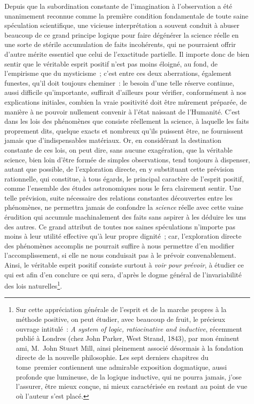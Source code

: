 \documentclass[french,twoside]{book} %
\begin{document}
Depuis que la subordination constante de l’imagination à l’observation a été unanimement reconnue comme la première condition fondamentale de toute saine spéculation scientifique, une vicieuse interprétation a souvent conduit à abuser beaucoup de ce grand principe logique pour faire dégénérer la science réelle en une sorte de stérile accumulation de faits incohérents, qui ne pourraient offrir d’autre mérite essentiel que celui de l’exactitude partielle. Il importe donc de bien sentir que le véritable esprit positif n’est pas moins éloigné, au fond, de l’empirisme que du mysticisme ; c’est entre ces deux aberrations, également funestes, qu’il doit toujours cheminer : le besoin d’une telle réserve continue, aussi difficile qu’importante, suffirait d’ailleurs pour vérifier, conformément à nos explications initiales, combien la vraie positivité doit être mûrement préparée, de manière à ne pouvoir nullement convenir à l’état naissant de l’Humanité. C’est dans les lois des phénomènes que consiste réellement la science, à laquelle les faits proprement dits, quelque exacts et nombreux qu’ils puissent être, ne fournissent jamais que d’indispensables matériaux. Or, en considérant la destination constante de ces lois, on peut dire, sans aucune exagération, que la véritable science, bien loin d’être formée de simples observations, tend toujours à dispenser, autant que possible, de l’exploration directe, en y substituant cette prévision rationnelle, qui constitue, à tous égards, le principal caractère de l’esprit positif, comme l’ensemble des études astronomiques nous le fera clairement sentir. Une telle prévision, suite nécessaire des relations constantes découvertes entre les phénomènes, ne permettra jamais de confondre la {\itshape science} réelle avec cette vaine érudition qui accumule machinalement des faits sans aspirer à les déduire les uns des autres. Ce grand attribut de toutes nos saines spéculations n’importe pas moins à leur utilité effective qu’à leur propre dignité ; car, l’exploration directe des phénomènes accomplis ne pourrait suffire à nous permettre d’en modifier l’accomplissement, si elle ne nous conduisait pas à le prévoir convenablement. Ainsi, le véritable esprit positif consiste surtout à {\itshape voir pour prévoir}, à étudier ce qui est afin d’en conclure ce qui sera, d’après le dogme général de l’invariabilité des lois naturelles\footnote{ Sur cette appréciation générale de l’esprit et de la marche propres à la méthode positive, on peut étudier, avec beaucoup de fruit, le précieux ouvrage intitulé : \emph{A system of logic, ratiocinative and inductive}, récemment publié à Londres (chez John Parker, West Strand, 1843), par mon éminent ami, M. John Stuart Mill, ainsi pleinement associé désormais à la fondation directe de la nouvelle philosophie. Les sept derniers chapitres du tome premier contiennent une admirable exposition dogmatique, aussi profonde que lumineuse, de la logique inductive, qui ne pourra jamais, j’ose l’assurer, être mieux conçue, ni mieux caractérisée en restant au point de vue où l’auteur s’est placé.}.\par
\end{document}
